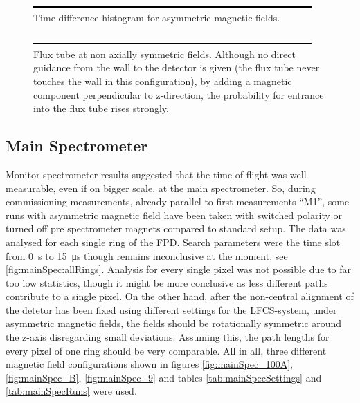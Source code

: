   \begin{figure}
	\label{fig:monSpec:timeDifferences asymmetric magnetic field}
	\caption[Time difference histogram]{Time difference histogram for asymmetric magnetic fields.}
  	\includegraphics{graphics/dummy.eps}
  \end{figure}
  
  \begin{figure}
	\label{fig:monSpec:timeDifferences non axially symmetric magnetic field}
	\caption[Non-axially symmetric magnetic flux tube monitor spectrometer]{Flux tube at non axially symmetric fields. Although no direct guidance from the wall to the detector is given (the flux tube never touches the wall in this configuration), by adding a magnetic component perpendicular to z-direction, the probability for entrance into the flux tube rises strongly.}
  	\includegraphics{graphics/dummy.eps}
  \end{figure}  
  \subsection{Main Spectrometer}
  \label{ch:Analysis:sec:Monitor Spectrometer Measurements:subsec:Main Spectrometer}
  
  Monitor-spectrometer results suggested that the time of flight was well measurable, even if on bigger scale, at the main spectrometer. So, during commissioning measurements, already parallel to first measurements ``M1'', some runs with asymmetric magnetic field have been taken with switched polarity or turned off pre spectrometer magnets compared to standard setup.
  The data was analysed for each single ring of the FPD. Search parameters were the time slot from \SI{0}{\second} to \SI{15}{\micro\second} though remains inconclusive at the moment, see \ref{fig:mainSpec:allRings}. Analysis for every single pixel was not possible due to far too low statistics, though it might be more conclusive as less different paths contribute to a single pixel. On the other hand, after the non-central alignment of the detetor has been fixed using different settings for the LFCS-system, under asymmetric magnetic fields, the fields should be rotationally symmetric around the z-axis disregarding small deviations. Assuming this, the path lengths for every pixel of one ring should be very comparable.
  All in all, three different magnetic field configurations shown in figures \ref{fig:mainSpec_100A}, \ref{fig:mainSpec_B}, \ref{fig:mainSpec_9} and tables \ref{tab:mainSpecSettings} and \ref{tab:mainSpecRuns} were used.
  
